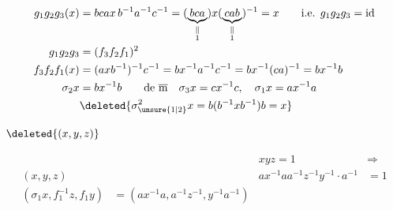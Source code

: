 \[
\begin{aligned}
g_1g_2g_3(x)&=bcax\,b^{-1}a^{-1}c^{-1}
=(\underbrace{bca}_{\substack{\|\\1}})x(\underbrace{cab}_{\substack{\|\\1}})^{-1}=x\qquad\text{i.e. }g_1g_2g_3=\mathrm{id}\\
g_1g_2g_3&=(f_3f_2f_1)^2\\
f_3f_2f_1(x)&=(axb^{-1})^{-1}c^{-1}=bx^{-1}a^{-1}c^{-1}=bx^{-1}(ca)^{-1}=bx^{-1}b\\
\sigma_2x&=bx^{-1}b\qquad\text{de }\overline{\mathrm m}\quad\sigma_3 x=cx^{-1}c,\quad\sigma_1x=ax^{-1}a\\
&\deleted{\sigma_{\unsure{1|2}}^2 x=b(b^{-1}xb^{-1})b=x}
\end{aligned}
\]

$\deleted{(x,y,z)}$

\[
\begin{aligned}
&&xyz=1&\Longrightarrow\\
(x,y,z)&&ax^{-1}aa^{-1}z^{-1}y^{-1}\cdot a^{-1}&=1\\
(\sigma_1 x,f_1^{-1}z,f_1y)&=(ax^{-1}a,a^{-1}z^{-1},y^{-1}a^{-1})
\end{aligned}
\]
